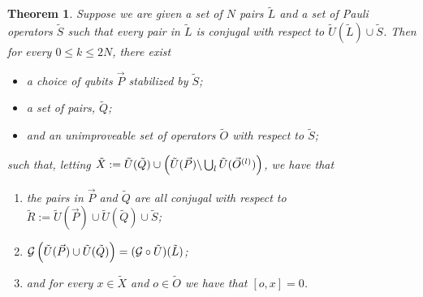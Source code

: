 \documentclass[twocolumn,showpacs,preprintnumbers,amsmath,amssymb,nofootinbib,pra,floatfix]{revtex4-1}
\newtheorem{theorem}{Theorem}
\newcommand{\lst}{\vec}
\newcommand{\set}{\tilde}
\newcommand{\genfun}{\mathcal{G}}
\begin{document}
\begin{comment}
Now let $l$ be the integer such that $\lst O^{(l)}_{|\lst O^{(l)}|}=o$.  For every operator $\lst O^{(l)}_i$ such that $i<|\lst O^{(l)}|$ we know that there must be an undetectable error that acts on $\lst O^{(l)}_i$ but not on $o$ since $\lst O^{(l)}_i=\lst O'^{(l)}_i$ and $o\in \set X'$.  Furthermore, every operator in $\set X$ is either an operator in $\set X'$ that commutes with $x$ or the product of $o$ with an operator that anti-commutes with $x$;  hence, there exists an undetectable error --- namely, $x$ --- that acts on $o$ but not on any operator in $\set X$.
\end{enumerate}
\end{description}

\end{proof}

\end{comment}
\begin{theorem}
Suppose we are given a set of $N$ pairs $\set L$ and a set of Pauli operators $\set S$ such that every pair in $\set L$ is conjugal with respect to $\set U(\set L)\cup\set S$.  Then for every $0\le k \le 2N$, there exist
\begin{itemize}
\item a choice of qubits $\lst P$ stabilized by $\set S$;
\item a set of pairs, $\set Q$;
\item and an unimproveable set of operators $\set O$ with respect to $\set S$;
\end{itemize}
such that, letting $\set X:=\set U(\set Q) \cup \paren{\set U(\lst P) \backslash \bigcup_l \set U(\lst O^{(l)})}$, we have that
\begin{enumerate}
\item \label{pairs are all conjugal to R} the pairs in $\lst P$ and $\set Q$ are all conjugal with respect to $\set R := \set U(\lst P)\cup \set U(\set Q)\cup \set S$;
\item $\genfun\paren{\set U(\lst P)\cup \set U(\set Q)}=(\genfun\circ\set U)(\set L)$;
\item and for every $x\in\set X$ and $o\in\set O$ we have that $[o,x]=0$.
\end{enumerate}
\end{theorem}
\end{document}
